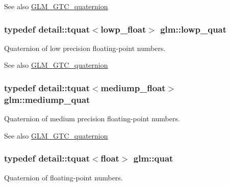 \begin{DoxySeeAlso}{See also}
\hyperlink{group__gtc__quaternion}{G\+L\+M\+\_\+\+G\+T\+C\+\_\+quaternion} 
\end{DoxySeeAlso}
\hypertarget{group__gtc__quaternion_ga0754d8cacc7c48dd300ea7cd2846d1d8}{}
\subsubsection[{lowp\+\_\+quat}]{\setlength{\rightskip}{0pt plus 5cm}typedef detail\+::tquat$<$lowp\+\_\+float$>$ {\bf glm\+::lowp\+\_\+quat}}\label{group__gtc__quaternion_ga0754d8cacc7c48dd300ea7cd2846d1d8}
Quaternion of low precision floating-\/point numbers.

\begin{DoxySeeAlso}{See also}
\hyperlink{group__gtc__quaternion}{G\+L\+M\+\_\+\+G\+T\+C\+\_\+quaternion} 
\end{DoxySeeAlso}
\hypertarget{group__gtc__quaternion_gaf4523725b36d8d422f44ea28fd37d407}{}
\subsubsection[{mediump\+\_\+quat}]{\setlength{\rightskip}{0pt plus 5cm}typedef detail\+::tquat$<$mediump\+\_\+float$>$ {\bf glm\+::mediump\+\_\+quat}}\label{group__gtc__quaternion_gaf4523725b36d8d422f44ea28fd37d407}
Quaternion of medium precision floating-\/point numbers.

\begin{DoxySeeAlso}{See also}
\hyperlink{group__gtc__quaternion}{G\+L\+M\+\_\+\+G\+T\+C\+\_\+quaternion} 
\end{DoxySeeAlso}
\hypertarget{group__gtc__quaternion_gae334c5746195639da0ed726b747aeee3}{}
\subsubsection[{quat}]{\setlength{\rightskip}{0pt plus 5cm}typedef detail\+::tquat$<$float$>$ {\bf glm\+::quat}}\label{group__gtc__quaternion_gae334c5746195639da0ed726b747aeee3}
Quaternion of floating-\/point numbers.

